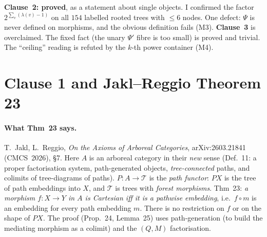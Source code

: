 \documentclass[11pt]{article}
\begin{document}
\textbf{Clause~2: proved}, as a statement about single objects. I confirmed the factor
$2^{\sum_v(\lambda(v)-1)}$ on all $154$ labelled rooted trees with $\le6$ nodes. One defect: $\Psi$
is never defined on morphisms, and the obvious definition fails (M3). \textbf{Clause~3} is overclaimed. The fixed
fact (the unary $\Psi'$ fibre is too small) is proved and trivial. The ``ceiling'' reading is
refuted by the $k$-th power container (M4).

\section{Clause 1 and Jakl--Reggio Theorem 23}

\paragraph{What Thm~23 says.} T.~Jakl, L.~Reggio, \emph{On the Axioms of Arboreal Categories},
arXiv:2603.21841 (CMCS~2026), \S7. Here $A$ is an arboreal category in their \emph{new} sense
(Def.~11: a proper factorisation system, path-generated objects, \emph{tree-connected} paths, and
colimits of tree-diagrams of paths). $P\colon A\to\mathcal T$ is the \emph{path functor}: $PX$ is the
tree of path embeddings into $X$, and $\mathcal T$ is trees with \emph{forest morphisms}. Thm~23:
\emph{a morphism $f\colon X\to Y$ in $A$ is Cartesian iff it is a pathwise embedding}, i.e.\ $f\circ m$
is an embedding for every path embedding $m$. There is no restriction on $f$ or on the shape of
$PX$. The proof (Prop.~24, Lemma~25) uses path-generation (to build the mediating morphism as a
colimit) and the $(Q,M)$ factorisation.
\end{document}

